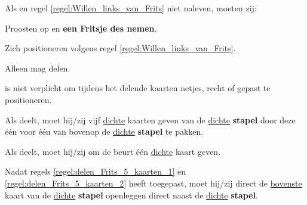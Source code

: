 \vervolgLijst{}
    \item Als \Frits en \Willem regel \ref{regel:Willen_links_van_Frits} niet naleven, moeten zij:
    \puntLijst{}
        \item Proosten op  en \textbf{een Fritsje des nemen}\footnotemark[1].
        \item Zich positioneren volgens regel \ref{regel:Willen_links_van_Frits}.
    \eindPuntLijst{}
\eindLijst{}


\newpage
{}
\label{sec:beginfase_einde}


\vervolgLijst{}
    \item Alleen \Frits mag delen\footnotemark[1].
    \label{regel:delen_Frits}
\eindLijst{}

\vervolgLijst{}
    \item \Frits is niet verplicht om tijdens het delen\footnotemark[1] de kaarten netjes, recht of gepast te positioneren.
\eindLijst{}

\vervolgLijst{}
    \item Als \Frits deelt\footnotemark[1], moet hij/zij \alleSpelers vijf \ul{dichte} kaarten geven van de \ul{dichte} \textbf{stapel} door deze één voor één van bovenop de \ul{dichte} \textbf{stapel} te pakken.
    \label{regel:delen_Frits_5_kaarten_1}
\eindLijst{}

\vervolgLijst{}
    \item Als \Frits deelt\footnotemark[1], moet hij/zij \alleSpelers om de beurt één \ul{dichte} kaart geven.
    \label{regel:delen_Frits_5_kaarten_2}
\eindLijst{}

\vervolgLijst{}
    \item Nadat \Frits regels \ref{regel:delen_Frits_5_kaarten_1} en \ref{regel:delen_Frits_5_kaarten_2} heeft toegepast, moet hij/zij direct de \ul{bovenste} kaart van de \ul{dichte} \textbf{stapel} openleggen direct naast de \ul{dichte} \textbf{stapel}.
    \label{regel:eerst_kaart_open}
\eindLijst{}   

